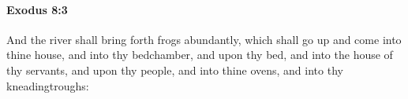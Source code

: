 
		\paragraph{Exodus 8:3} %
			\label{EXODUS-8-3}

			And the river shall bring forth frogs abundantly, which shall go up and come into thine house, and into thy bedchamber, and upon thy bed, and into the house of thy servants, and upon thy people, and into thine ovens, and into thy kneadingtroughs:


